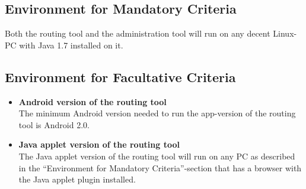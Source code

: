 \subsection{Environment for Mandatory Criteria}
Both the routing tool and the administration tool will run on any decent Linux-PC with Java 1.7 installed on it. 

\subsection{Environment for Facultative Criteria}
\begin{itemize}
	\item \textbf{Android version of the routing tool}\\ 
	The minimum Android version needed to run the app-version of the routing tool is Android 2.0.

	\item \textbf{Java applet version of the routing tool}\\ 
	The Java applet version of the routing tool will run on any PC as described in the ``Environment for Mandatory Criteria''-section that
	has a browser with the Java applet plugin installed.
\end{itemize}